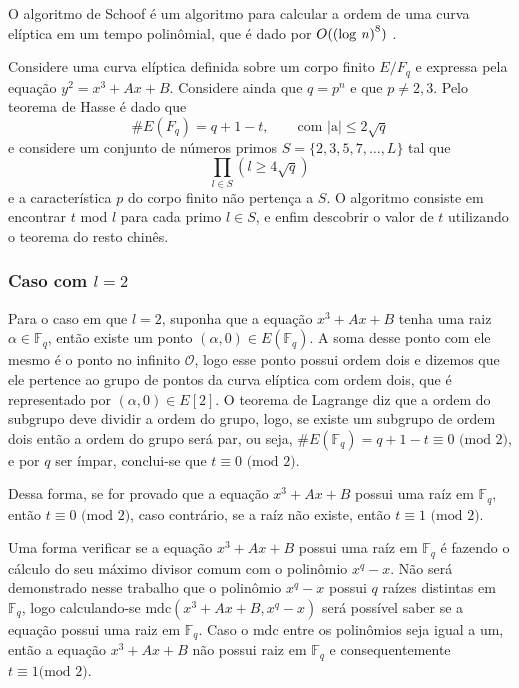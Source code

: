 \begin{apendicesenv}
O algoritmo de Schoof é um algoritmo para calcular a ordem de uma curva elíptica em um tempo polinômial, que é dado por $O(\mbox{(log \textit{n})}^8)$ \cite{Silverman:2009}.

Considere uma curva elíptica definida sobre um corpo finito $E/F_q$ e expressa pela equação $y^2 = x^3 + Ax + B$. Considere ainda que $q = p^n$ e que $p \neq 2,3$. Pelo teorema de Hasse é dado que
$$
\#E(F_q) = q + 1 - t, \qquad \mbox{com |a|} \leq 2 \sqrt{q}
$$
e considere um conjunto de números primos $S = \{2,3,5,7,\dots,L\}$ tal que
$$
\prod_{l \in S} (l \geq 4 \sqrt{q})
$$
e a característica $p$ do corpo finito não pertença a $S$.
O algoritmo consiste em encontrar $t$ mod $l$ para cada primo $l \in S$, e enfim descobrir o valor de $t$ utilizando o teorema do resto chinês.\cite{Alvarado:2005}

\subsubsection{Caso com $l=2$}
Para o caso em que $l = 2$, suponha que a equação $x^3 + Ax + B$ tenha uma raiz $\alpha \in \mathbb{F}_q$, então existe um ponto $(\alpha, 0) \in E(\mathbb{F}_q)$. A soma desse ponto com ele mesmo é o ponto no infinito $\mathcal{O}$, logo esse ponto possui ordem dois e dizemos que ele pertence ao grupo de pontos da curva elíptica com ordem dois, que é representado por $(\alpha,0) \in E[2]$. O teorema de Lagrange diz que a ordem do subgrupo deve dividir a ordem do grupo, logo, se existe um subgrupo de ordem dois então a ordem do grupo será par, ou seja, $\#E(\mathbb{F}_q) = q + 1 - t \equiv 0\mbox{ (mod 2)}$, e por $q$ ser ímpar, conclui-se que $t \equiv 0 \mbox{ (mod 2)}$. \cite{Alvarado:2005}

Dessa forma, se for provado que a equação $x^3 + Ax + B$ possui uma raíz em $\mathbb{F}_q$, então $t \equiv 0 \mbox{ (mod 2)}$, caso contrário, se a raíz não existe, então $t \equiv 1 \mbox{ (mod 2)}$.\cite{McGee:2006}

Uma forma verificar se a equação $x^3 + Ax + B$ possui uma raíz em $\mathbb{F}_q$ é fazendo o cálculo do seu máximo divisor comum com o polinômio $x^q - x$. Não será demonstrado nesse trabalho que o polinômio $x^q - x$ possui $q$ raízes distintas em $\mathbb{F}_q$, logo calculando-se $\mbox{mdc}(x^3 + Ax + B, x^q - x)$ será possível saber se a equação possui uma raiz em $\mathbb{F}_q$. Caso o mdc entre os polinômios seja igual a um, então a equação $x^3 + Ax + B$ não possui raiz em $\mathbb{F}_q$ e consequentemente $t \equiv 1\mbox{(mod 2)}$.\cite{McGee:2006}


\end{apendicesenv}
